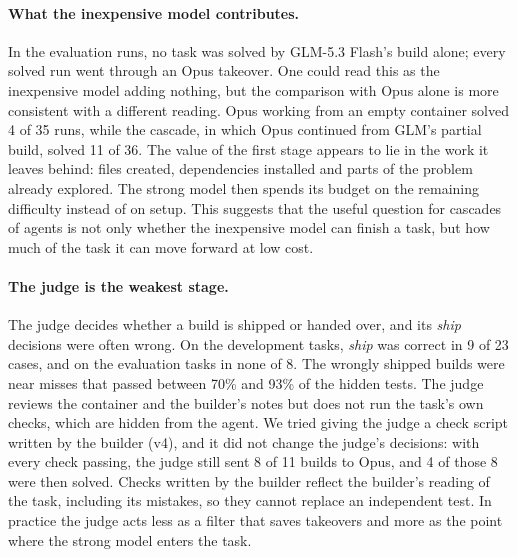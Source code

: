 \paragraph{What the inexpensive model contributes.}
In the evaluation runs, no task was solved by GLM-5.3 Flash's build alone; every solved run went through an Opus
takeover. One could read this as the inexpensive model adding nothing, but the comparison with Opus alone is
more consistent with a different reading. Opus working from an empty container solved 4 of 35 runs, while the cascade, in which
Opus continued from GLM's partial build, solved 11 of 36. The value of the first stage appears to lie in the work it leaves behind: files
created, dependencies installed and parts of the problem already explored. The strong model then spends its
budget on the remaining difficulty instead of on setup. This suggests that the useful question for cascades of
agents is not only whether the inexpensive model can finish a task, but how much of the task it can move forward
at low cost.

\paragraph{The judge is the weakest stage.}
The judge decides whether a build is shipped or handed over, and its \emph{ship} decisions were often wrong. On
the development tasks, \emph{ship} was correct in 9 of 23 cases, and on the evaluation tasks in none of 8. The
wrongly shipped builds were near misses that passed between 70\% and 93\% of the hidden tests. The judge reviews
the container and the builder's notes but does not run the task's own checks, which are hidden from the agent.
We tried giving the judge a check script written by the builder (v4), and it did not change the judge's
decisions: with every check passing, the judge still sent 8 of 11 builds to Opus, and 4 of those 8 were then
solved. Checks written by the builder reflect the builder's reading of the task, including its mistakes, so they
cannot replace an independent test. In practice the judge acts less as a filter that saves takeovers and more as
the point where the strong model enters the task.

